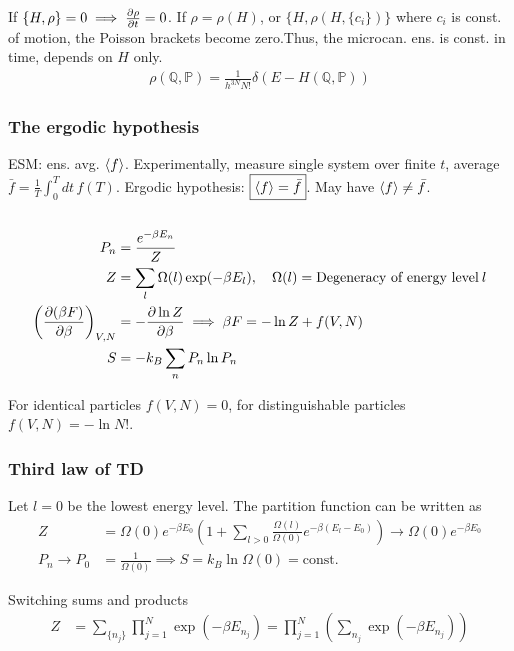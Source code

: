 \documentclass[a4paper, english, 12pt]{article}
\newcommand{\closed}[1]{\left( #1 \right)}
\newcommand{\curly}[1]{\{ #1 \} }
\newcommand{\Q}{\mathbb{Q}}
\renewcommand{\P}{\mathbb{P}}
\begin{document}
\begin{multicols*}{2}
If $\curly{H,\rho}=0\implies\pdv{\rho}{t}=0$. If $\rho=\rho(H)$, or $\curly{H,\rho(H,\curly{c_i})}$ where $c_i$ is const. of motion, the Poisson brackets become zero.Thus, the microcan. ens. is const. in time, depends on $H$ only. 
\begin{align*}
    \rho(\Q,\P) = \frac{1}{h^{3N} N!} \delta\closed{E-H(\Q,\P)}
\end{align*}


\subsubsection*{\tiny The ergodic hypothesis}
ESM: ens. avg. $\expval{f}$. Experimentally, measure single system over finite $t$, average $\bar{f}=\frac{1}{T} \int_0^T dt\,f(T)$. Ergodic hypothesis: $\boxed{\expval{f}=\bar{f}}$. May have $\expval{f}\neq\bar{f}$.


\subsection*{}

\begin{align*}
    P_n &= \frac{e^{-\beta E_n}}{Z} \\
    Z &= \sum_l \Omega(l)\exp(-\beta E_l),\quad \Omega(l)=\text{Degeneracy of energy level}\: l \\
    \closed{\pdv{(\beta F)}{\beta}}_{V,N} &= -\pdv{\ln Z}{\beta} \implies \beta F = -\ln Z + f(V,N) \\
    S &= -k_B \sum_n P_n \ln P_n
\end{align*}


For identical particles $f(V,N)=0$, for distinguishable particles $f(V,N)=-\ln N!$. 


\subsubsection*{\scriptsize Third law of TD}
Let $l=0$ be the lowest energy level. The partition function can be written as 
\begin{align*}
    Z &= \Omega(0)e^{-\beta E_0} \closed{1 + \sum_{l>0} \frac{\Omega(l)}{\Omega(0)} e^{-\beta(E_l-E_0)} } \to \Omega(0)e^{-\beta E_0}   \\
    P_n \to P_0 &= \frac{1}{\Omega(0)} \implies S = k_B \ln \Omega(0) = \text{const.} 
\end{align*}

Switching sums and products 
\begin{align*}
    Z &= \sum_{\curly{n_j}} \prod_{j=1}^N \exp(-\beta E_{n_j}) = \prod_{j=1}^N \left( \sum_{n_j} \exp(-\beta E_{n_j}) \right)
\end{align*}



\end{multicols*}
\end{document}
